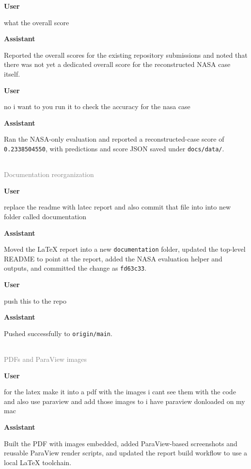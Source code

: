 \documentclass[11pt]{article}
\newcommand{\turnheader}[2]{
  \vspace{0.8em}
  \noindent{\large\textbf{#1}}\\
  \noindent\textcolor{gray}{#2}
  \vspace{0.35em}
}
\newenvironment{chatuser}
  {\par\noindent\color{userblue}\textbf{User}\par\noindent\begin{minipage}{\linewidth}\raggedright}
  {\end{minipage}\par}
\newenvironment{chatassistant}
  {\par\noindent\color{assistantgreen}\textbf{Assistant}\par\noindent\begin{minipage}{\linewidth}\raggedright}
  {\end{minipage}\par}
\begin{document}
\begin{chatuser}
what the overall score
\end{chatuser}

\begin{chatassistant}
Reported the overall scores for the existing repository submissions and noted that there was not yet a dedicated overall score for the reconstructed NASA case itself.
\end{chatassistant}

\begin{chatuser}
no i want to you run it to check the accuracy for the nasa case
\end{chatuser}

\begin{chatassistant}
Ran the NASA-only evaluation and reported a reconstructed-case score of \texttt{0.2338504550}, with predictions and score JSON saved under \texttt{docs/data/}.
\end{chatassistant}

\turnheader{Turn 3}{Documentation reorganization}
\begin{chatuser}
replace the readme with latec report and also commit that file into into new folder called documentation
\end{chatuser}

\begin{chatassistant}
Moved the LaTeX report into a new \texttt{documentation} folder, updated the top-level README to point at the report, added the NASA evaluation helper and outputs, and committed the change as \texttt{fd63c33}.
\end{chatassistant}

\begin{chatuser}
push this to the repo
\end{chatuser}

\begin{chatassistant}
Pushed successfully to \texttt{origin/main}.
\end{chatassistant}

\turnheader{Turn 4}{PDFs and ParaView images}
\begin{chatuser}
for the latex make it into a pdf with the images i cant see them with the code and also use paraview and add those images to i have paraview donloaded on my mac
\end{chatuser}

\begin{chatassistant}
Built the PDF with images embedded, added ParaView-based screenshots and reusable ParaView render scripts, and updated the report build workflow to use a local LaTeX toolchain.
\end{chatassistant}
\end{document}
